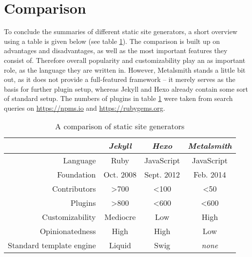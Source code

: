 \section{Comparison}
\label{sec:comparison}

To conclude the summaries of different static site generators, a short overview using a table is given below (see table \ref{table:comparison}). The comparison is built up on advantages and disadvantages, as well as the most important features they consist of. Therefore overall popularity and customizability play an as important role, as the language they are written in. However, Metalsmith stands a little bit out, as it does not provide a full-featured framework -- it merely serves as the basis for further plugin setup, whereas Jekyll and Hexo already contain some sort of standard setup.
The numbers of plugins in table \ref{table:comparison} were taken from search queries on \url{https://npms.io} and \url{https://rubygems.org}.

\begin{table}[h]
  \caption{A comparison of static site generators}
  \label{table:comparison}
  \centering
  \setlength{\tabcolsep}{5mm}
  \def\arraystretch{1.25}
  \begin{tabular}{|r||c|c|c|}
    \hline
    & \emph{Jekyll} & \emph{Hexo} & \emph{Metalsmith} \\
    \hline
    \hline
    Language & Ruby & JavaScript & JavaScript \\
    \hline
    Foundation & Oct. 2008 & Sept. 2012 & Feb. 2014 \\
    \hline
    Contributors & >700 & <100 & <50 \\
    \hline
    Plugins & >800 & <600 & <600 \\
    \hline
    Customizability & Mediocre & Low & High \\
    \hline
    Opinionatedness & High & High & Low \\
    \hline
    Standard template engine & Liquid & Swig & \emph{none} \\
    \hline
  \end{tabular}

\end{table}
